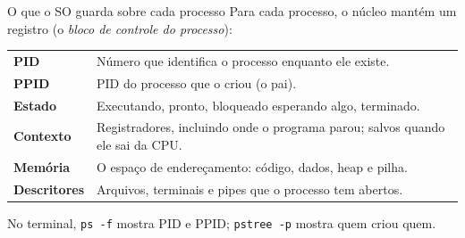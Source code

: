 \documentclass[aspectratio=169]{beamer}
\begin{document}
\begin{frame}{O que o SO guarda sobre cada processo}
Para cada processo, o núcleo mantém um registro (o \emph{bloco de controle do processo}):

\vspace{0.4em}
\begin{center}
\small
\begin{tabular}{@{}lp{9.6cm}@{}}
\toprule
\textbf{PID} & Número que identifica o processo enquanto ele existe. \\
\textbf{PPID} & PID do processo que o criou (o pai). \\
\textbf{Estado} & Executando, pronto, bloqueado esperando algo, terminado. \\
\textbf{Contexto} & Registradores, incluindo onde o programa parou; salvos quando ele sai da CPU. \\
\textbf{Memória} & O espaço de endereçamento: código, dados, heap e pilha. \\
\textbf{Descritores} & Arquivos, terminais e pipes que o processo tem abertos. \\
\bottomrule
\end{tabular}
\end{center}

\vspace{0.3em}
\small No terminal, \texttt{ps -f} mostra PID e PPID; \texttt{pstree -p} mostra quem criou quem.
\end{frame}
\end{document}
